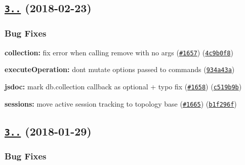 \label{_3.0.3}%
 \subsection*{\href{https://github.com/mongodb/node-mongodb-native/compare/v3.0.2...v3.0.3}{\tt 3..} (2018-\/02-\/23)}

\subsubsection*{Bug Fixes}


\begin{DoxyItemize}
\item {\bfseries collection\+:} fix error when calling remove with no args (\href{https://github.com/mongodb/node-mongodb-native/issues/1657}{\tt \#1657}) (\href{https://github.com/mongodb/node-mongodb-native/commit/4c9b0f8}{\tt 4c9b0f8})
\item {\bfseries execute\+Operation\+:} don\textquotesingle{}t mutate options passed to commands (\href{https://github.com/mongodb/node-mongodb-native/commit/934a43a}{\tt 934a43a})
\item {\bfseries jsdoc\+:} mark db.\+collection callback as optional + typo fix (\href{https://github.com/mongodb/node-mongodb-native/issues/1658}{\tt \#1658}) (\href{https://github.com/mongodb/node-mongodb-native/commit/c519b9b}{\tt c519b9b})
\item {\bfseries sessions\+:} move active session tracking to topology base (\href{https://github.com/mongodb/node-mongodb-native/issues/1665}{\tt \#1665}) (\href{https://github.com/mongodb/node-mongodb-native/commit/b1f296f}{\tt b1f296f})
\end{DoxyItemize}

\label{_3.0.2}%
 \subsection*{\href{https://github.com/mongodb/node-mongodb-native/compare/v3.0.1...v3.0.2}{\tt 3..} (2018-\/01-\/29)}

\subsubsection*{Bug Fixes}



